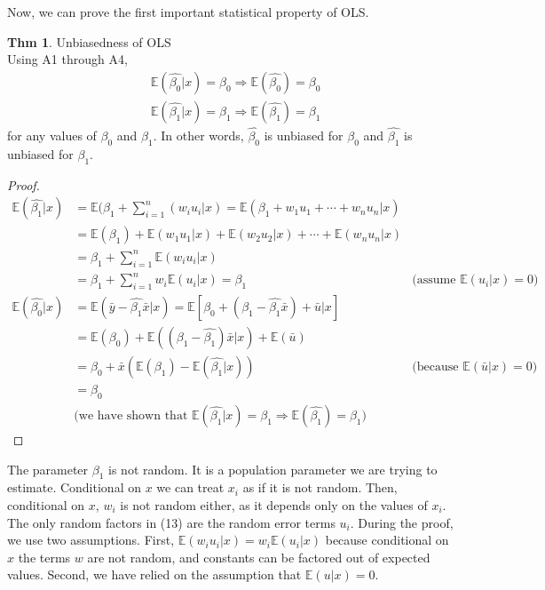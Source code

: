 \documentclass[a4paper, 10pt]{article}
\theoremstyle{definition}	%
\newtheorem{theorem}{Thm}
\begin{document}
Now, we can prove the first important statistical property of OLS.
\begin{theorem}
    Unbiasedness of OLS\\
    Using A1 through A4,
    \begin{align*}
        &\mathbb{E}(\hat{\beta_0}|x) = \beta_0 \Rightarrow \mathbb{E}(\hat{\beta_0}) = \beta_0\\
        &\mathbb{E}(\hat{\beta_1}|x) = \beta_1 \Rightarrow \mathbb{E}(\hat{\beta_1}) = \beta_1
    \end{align*}
    for any values of $\beta_0$ and $\beta_1$. In other words, $\hat{\beta_0}$ is unbiased for $\beta_0$ and $\hat{\beta_1}$ is unbiased for $\beta_1$.
\end{theorem}
\begin{proof}
    \begin{align*}
        \mathbb{E}(\hat{\beta_1}|x) &= \mathbb{E}(\beta_1 + \sum_{i=1}^{n}(w_i u_i|x) = \mathbb{E}(\beta_1 + w_1 u_1 + \cdots + w_n u_n|x)\\
        &= \mathbb{E}(\beta_1) + \mathbb{E}( w_1 u_1|x) +  \mathbb{E}( w_2 u_2|x) + \cdots + \mathbb{E}( w_n u_n|x)\\
        &= \beta_1 + \sum_{i=1}^{n}\mathbb{E}(w_i u_i|x)\\
        &= \beta_1 + \sum_{i=1}^{n}w_i\mathbb{E}(u_i|x) = \beta_1 
        & \text{(assume $\mathbb{E}(u_i|x) = 0$)}\\
        \mathbb{E}(\hat{\beta_0}|x) &= \mathbb{E}(\bar{y} - \hat{\beta_1}\bar{x}|x) = \mathbb{E}\left[\beta_0 + (\beta_1 - \hat{\beta_1}\bar{x}) + \bar{u}|x\right]\\
        &= \mathbb{E}(\beta_0) + \mathbb{E}\left((\beta_1 - \hat{\beta_1})\bar{x}|x\right) + \mathbb{E}(\bar{u})\\
        &= \beta_0 + \bar{x}\left(\mathbb{E}(\beta_1) - \mathbb{E}(\hat{\beta_1}|x)\right) 
        & \text{(because $\mathbb{E}(\bar{u}|x) = 0$)}\\
        &= \beta_0\\
        & \text{(we have shown that $\mathbb{E}(\hat{\beta_1}|x) = \beta_1 \Rightarrow \mathbb{E}(\hat{\beta_1}) = \beta_1$)}        
    \end{align*}
\end{proof}
The parameter $\beta_1$ is not random. It is a population parameter we are trying to estimate. Conditional on $x$ we can treat $x_i$ as if it is not random. Then, conditional on $x$, $w_i$ is not random either, as it depends only on the values of $x_i$. The only random factors in (13) are the random error terms $u_i$. During the proof, we use two assumptions. First, $\mathbb{E}(w_i u_i|x) = w_i\mathbb{E} (u_i|x)$ because conditional on $x$ the terms $w$ are not random, and constants can be factored out of expected values. Second, we have relied on the assumption that $\mathbb{E}(u|x) = 0$.
\end{document}
